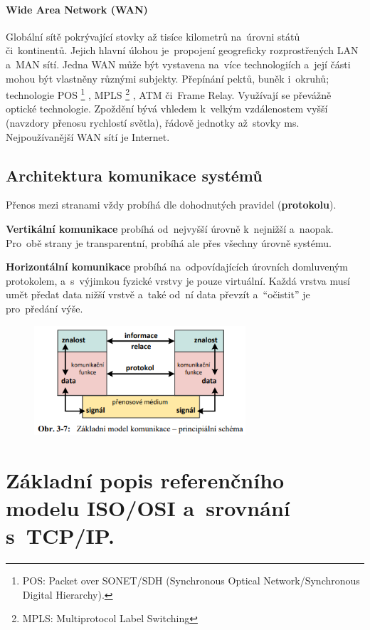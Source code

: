 \paragraph{Wide Area Network (WAN)} Globální sítě pokrývající stovky až tisíce kilometrů na~úrovni států či~kontinentů. Jejich hlavní úlohou je~propojení geogreficky rozprostřených LAN a~MAN sítí. Jedna WAN může být vystavena na~více technologiích a~její části mohou být vlastněny různými subjekty. Přepínání pektů, buněk i~okruhů; technologie POS%
\footnote{POS: Packet over SONET/SDH (Synchronous Optical Network/Synchronous Digital Hierarchy).}%
, MPLS%
\footnote{MPLS: Multiprotocol Label Switching}%
, ATM či~Frame Relay. Využívají se převážně optické technologie. Zpoždění bývá vhledem k~velkým vzdálenostem vyšší (navzdory přenosu rychlostí světla), řádově jednotky až~stovky ms. Nejpoužívanější WAN sítí je Internet.

\subsection{Architektura komunikace systémů}

Přenos mezi stranami vždy probíhá dle dohodnutých pravidel (\textbf{protokolu}).

\textbf{Vertikální komunikace} probíhá od~nejvyšší úrovně k~nejnižší a~naopak. Pro~obě strany je transparentní, probíhá ale přes všechny úrovně systému.

\textbf{Horizontální komunikace} probíhá na~odpovídajících úrovních domluveným protokolem, a~s~výjimkou fyzické vrstvy je pouze virtuální. Každá vrstva musí umět předat data nižší vrstvě a~také od~ní data převzít a~\enquote{očistit} je pro~předání výše.

\begin{figure}[ht]
	\centering
	\includegraphics[width=0.7\textwidth]{images/q01_communication_architecture}
\end{figure}

\clearpage
\section{Základní popis referenčního modelu ISO/OSI a~srovnání s~TCP/IP.}


